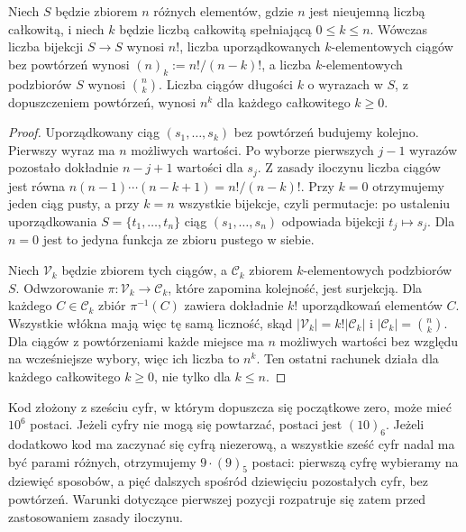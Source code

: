 \begin{twierdzenie}
Niech $S$ będzie zbiorem $n$ różnych elementów, gdzie $n$
jest nieujemną liczbą całkowitą, i niech $k$ będzie liczbą całkowitą
spełniającą $0\leq k\leq n$.
Wówczas liczba bijekcji $S\to S$ wynosi $n!$, liczba uporządkowanych
$k$-elementowych ciągów bez powtórzeń wynosi
$(n)_k:=n!/(n-k)!$, a liczba $k$-elementowych podzbiorów $S$ wynosi
$\binom nk$. Liczba ciągów długości $k$ o wyrazach w $S$, z dopuszczeniem
powtórzeń, wynosi $n^k$ dla każdego całkowitego $k\geq0$.
\end{twierdzenie}
\begin{proof}
Uporządkowany ciąg $(s_1,\ldots,s_k)$ bez powtórzeń
budujemy kolejno. Pierwszy wyraz ma $n$ możliwych wartości.
Po wyborze pierwszych $j-1$ wyrazów pozostało dokładnie
$n-j+1$ wartości dla $s_j$. Z zasady iloczynu liczba
ciągów jest równa
$n(n-1)\cdots(n-k+1)=n!/(n-k)!$.
Przy $k=0$ otrzymujemy jeden ciąg pusty,
a przy $k=n$ wszystkie bijekcje, czyli permutacje:
po ustaleniu uporządkowania $S=\{t_1,\ldots,t_n\}$ ciąg
$(s_1,\ldots,s_n)$ odpowiada bijekcji $t_j\mapsto s_j$.
Dla $n=0$ jest to jedyna funkcja ze zbioru pustego w siebie.

Niech $\mathcal V_k$ będzie zbiorem tych ciągów, a
$\mathcal C_k$ zbiorem $k$-elementowych podzbiorów $S$.
Odwzorowanie $\pi:\mathcal V_k\to\mathcal C_k$,
które zapomina kolejność, jest surjekcją. Dla
każdego $C\in\mathcal C_k$ zbiór $\pi^{-1}(C)$
zawiera dokładnie $k!$ uporządkowań elementów $C$.
Wszystkie włókna mają więc tę samą liczność, skąd
$|\mathcal V_k|=k!|\mathcal C_k|$ i
$|\mathcal C_k|=\binom nk$.
Dla ciągów z powtórzeniami każde miejsce ma $n$
możliwych wartości bez względu na wcześniejsze wybory,
więc ich liczba to $n^k$. Ten ostatni rachunek działa dla
każdego całkowitego $k\geq0$, nie tylko dla $k\leq n$.
\end{proof}

\begin{przyklad}
Kod złożony z sześciu cyfr, w którym dopuszcza się początkowe zero,
może mieć $10^6$ postaci. Jeżeli cyfry nie mogą się powtarzać,
postaci jest $(10)_6$. Jeżeli dodatkowo kod ma zaczynać się cyfrą niezerową,
a wszystkie sześć cyfr nadal ma być parami różnych,
otrzymujemy $9\cdot(9)_5$ postaci: pierwszą cyfrę wybieramy
na dziewięć sposobów, a pięć dalszych spośród dziewięciu
pozostałych cyfr, bez powtórzeń. Warunki dotyczące pierwszej pozycji rozpatruje się
zatem przed zastosowaniem zasady iloczynu.
\end{przyklad}

